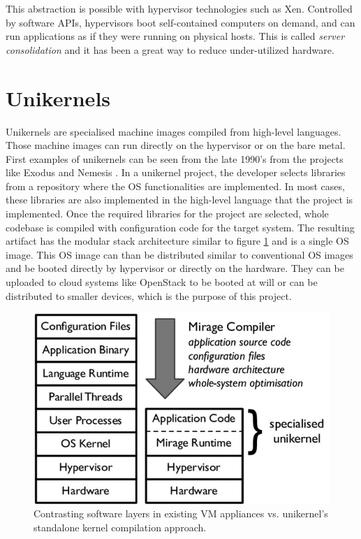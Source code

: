 This abstraction is possible with hypervisor technologies such as Xen. Controlled by software APIs, hypervisors boot self-contained computers on demand, and can run applications as if they were running on physical hosts. This is called \textit{server consolidation} and it has been a great way to reduce under-utilized hardware. 

\section{Unikernels}
Unikernels \cite{library-operating-system} \cite{madhavapeddy2014unikernels} are specialised machine images compiled from high-level languages. Those machine images can run directly on the hypervisor or on the bare metal. First examples of unikernels can be seen from the late 1990's from the projects like Exodus\cite{exokernel} and Nemesis \cite{nemesis}. In a unikernel project, the developer selects libraries from a repository where the OS functionalities are implemented. In most cases, these libraries are also implemented in the high-level language that the project is implemented. Once the required libraries for the project are selected, whole codebase is compiled with configuration code for the target system. The resulting artifact has the modular stack architecture similar to figure \ref{fig:unikernel-arch} and is a single OS image. This OS image can than be distributed similar to conventional OS images and be booted directly by hypervisor or directly on the hardware. They can be uploaded to cloud systems like OpenStack \cite{openstack} to be booted at will or can be distributed to smaller devices, which is the purpose of this project.

\begin{figure}[htpb]
  \centering
  \includegraphics[height=0.3\textwidth]{figures/Contrasting-software-layers-in-existing-VM-appliances-vs-unikernels-standalone-kernel_W640.jpg}
  \caption{ Contrasting software layers in existing VM appliances vs. unikernel’s standalone kernel compilation approach. \cite{library-operating-system}} \label{fig:unikernel-arch}
\end{figure}

